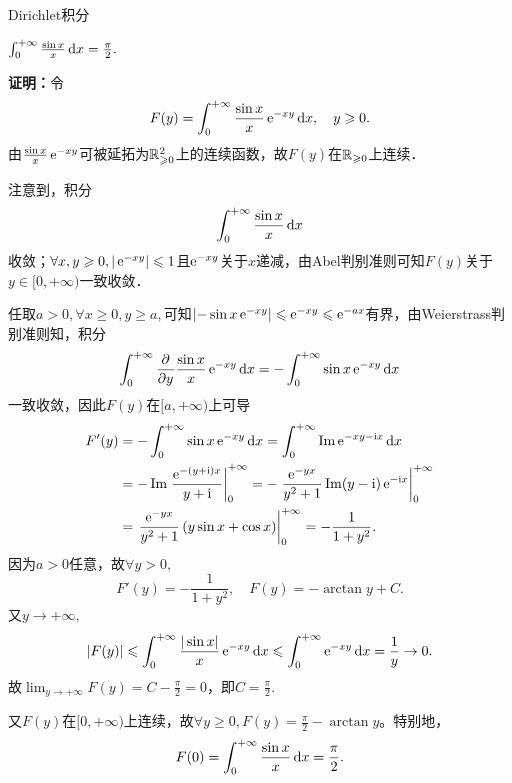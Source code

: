 \begin{example}{Dirichlet积分}{}
	\begin{center}
		$\int_0^{+\infty}\frac{\sin x}x\mathop{}\!\mathrm{d} x=\frac{\pi}2.$
	\end{center}
	\textbf{证明：}令
	\[
		F(y)=\int_0^{+\infty}\frac{\sin x}x\mathop{}\!\mathrm{e}^{-xy}\mathop{}\!\mathrm{d} x,\quad y\geqslant 0.
	\]
	由$\frac{\sin x}x\mathop{}\!\mathrm{e}^{-xy}$可被延拓为$\mathbb R_{\geqslant 0}^2$上的连续函数，故$F(y)$在$\mathbb R_{\geqslant 0}$上连续．

	注意到，积分
	\[
		\int_0^{+\infty}\frac{\sin x}x\mathop{}\!\mathrm{d} x
	\]
	收敛；$\forall x,y\geqslant 0,|\mathop{}\!\mathrm{e}^{-xy}|\leqslant 1$且$\mathop{}\!\mathrm{e}^{-xy}$关于$x$递减，由Abel判别准则可知$F(y)$关于$y\in[0,+\infty)$一致收敛．

	任取$a>0,\forall x\geqslant 0,y\geqslant a,$可知$\left|-\sin x\mathop{}\!\mathrm{e}^{-xy}\right|\leqslant \mathop{}\!\mathrm{e}^{-xy}\leqslant \mathop{}\!\mathrm{e}^{-ax}$有界，由Weierstrass判别准则知，积分
	\[
		\int_0^{+\infty}\frac{\partial^{{}}}{\partial{y}^{{}}}\frac{\sin x}x\mathop{}\!\mathrm{e}^{-xy}\mathop{}\!\mathrm{d} x=-\int_0^{+\infty}\sin x\mathop{}\!\mathrm{e}^{-xy}\mathop{}\!\mathrm{d} x
	\]
	一致收敛，因此$F(y)$在$[a,+\infty)$上可导
	\begin{align*}
		F'(y) & =-\int\zti\sin x\e{-xy}\d x=\int\zti\Im\e{-xy-\i x}\d x                                                \\
			  & =-\Im\left.\frac{\e{-(y+\i)x}}{y+\i}\right|\zti=-\left.\frac{\e{-yx}}{y^2+1}\Im(y-\i)\e{-\i x}\right|\zti \\
			  & =\left.\frac{\e{-yx}}{y^2+1}\left(y\sin x+\cos x\right)\right|\zti=-\frac1{1+y^2}.
	\end{align*}
	因为$a>0$任意，故$\forall y>0,$
	\[
		F'(y)=-\frac1{1+y^2},\quad F(y)=-\arctan y+C.
	\]
	又$y\to+\infty,$
	\[
		|F(y)|\leqslant\int_0^{+\infty}\frac{|\sin x|}x\mathop{}\!\mathrm{e}^{-xy}\mathop{}\!\mathrm{d} x\leqslant\int_0^{+\infty}\mathop{}\!\mathrm{e}^{-xy}\mathop{}\!\mathrm{d} x=\frac1y\to0.
	\]
	故$\lim_{y\to+\infty}F(y)=C-\frac{\pi}2=0$，即$C=\frac{\pi}2.$

	又$F(y)$在$[0,+\infty)$上连续，故$\forall y\geqslant 0,F(y)=\frac{\pi}2-\arctan y$。特别地，
	\[
		F(0)=\int_0^{+\infty}\frac{\sin x}x\mathop{}\!\mathrm{d} x=\frac{\pi}2.
	\]
\end{example}
\newpage
